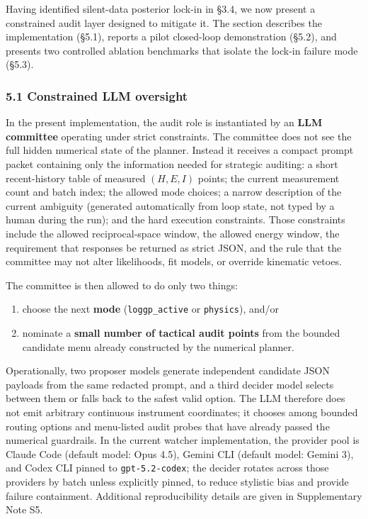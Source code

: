 \documentclass[
]{article}
\providecommand{\tightlist}{%
  \setlength{\itemsep}{0pt}\setlength{\parskip}{0pt}}
\begin{document}
Having identified silent-data posterior lock-in in §3.4, we now present
a constrained audit layer designed to mitigate it. The section describes
the implementation (§5.1), reports a pilot closed-loop demonstration
(§5.2), and presents two controlled ablation benchmarks that isolate the
lock-in failure mode (§5.3).

\hypertarget{constrained-llm-oversight}{%
\subsubsection{5.1 Constrained LLM
oversight}\label{constrained-llm-oversight}}

In the present implementation, the audit role is instantiated by an
\textbf{LLM committee} operating under strict constraints. The committee
does not see the full hidden numerical state of the planner. Instead it
receives a compact prompt packet containing only the information needed
for strategic auditing: a short recent-history table of measured
\((H,E,I)\) points; the current measurement count and batch index; the
allowed mode choices; a narrow description of the current ambiguity
(generated automatically from loop state, not typed by a human during
the run); and the hard execution constraints. Those constraints include
the allowed reciprocal-space window, the allowed energy window, the
requirement that responses be returned as strict JSON, and the rule that
the committee may not alter likelihoods, fit models, or override
kinematic vetoes.

The committee is then allowed to do only two things:

\begin{enumerate}
\def\labelenumi{\arabic{enumi}.}
\tightlist
\item
  choose the next \textbf{mode} (\texttt{loggp\_active} or
  \texttt{physics}), and/or\\
\item
  nominate a \textbf{small number of tactical audit points} from the
  bounded candidate menu already constructed by the numerical planner.
\end{enumerate}

Operationally, two proposer models generate independent candidate JSON
payloads from the same redacted prompt, and a third decider model
selects between them or falls back to the safest valid option. The LLM
therefore does not emit arbitrary continuous instrument coordinates; it
chooses among bounded routing options and menu-listed audit probes that
have already passed the numerical guardrails. In the current watcher
implementation, the provider pool is Claude Code (default model: Opus
4.5), Gemini CLI (default model: Gemini 3), and Codex CLI pinned to
\texttt{gpt-5.2-codex}; the decider rotates across those providers by
batch unless explicitly pinned, to reduce stylistic bias and provide
failure containment. Additional reproducibility details are given in
Supplementary Note S5.
\end{document}
